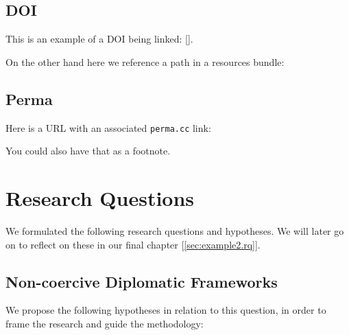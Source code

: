 \subsection{DOI}
\label{sec:example.links.doi}


This is an example of a DOI being linked: [].

On the other hand here we reference a path in a resources bundle:\\

\subsection{Perma}
\label{sec:example.links.perma}

Here is a URL with an associated \texttt{perma.cc} link:\\

You could also have that as a footnote.

\vspace{1em}

\clearpage

\section{Research Questions}
\label{sec:example.rq}

We formulated the following research questions and hypotheses.  We will later go on to reflect on these in our final chapter [\ref{sec:example2.rq}].

\subsection{Non-coercive Diplomatic Frameworks}
\label{subsec:example.rq.diplomatic}

\begin{researchquestion}
	\label{rq:diplomatic}
	\RQDiplomatic
\end{researchquestion}

We propose the following hypotheses in relation to this question, in order to frame the research and guide the methodology:

\begin{hypothesis}
	\label{hyp:diplomatic.first}
	\HDiplomaticA
\end{hypothesis}

